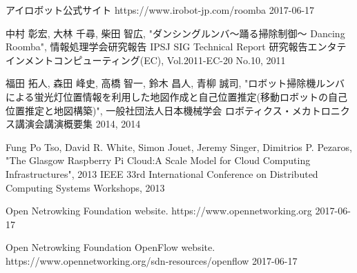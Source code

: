 \documentclass[a4paper, twocolumn]{jarticle}
\begin{document}
\begin{thebibliography}{9}
	{\small
    アイロボット公式サイト https://www.irobot-jp.com/roomba 2017-06-17

    中村 彰宏, 大林 千尋, 柴田 智広, "ダンシングルンバ～踊る掃除制御～
Dancing Roomba", 情報処理学会研究報告 IPSJ SIG Technical Report 研究報告エンタテインメントコンピューティング(EC), Vol.2011-EC-20 No.10, 2011

    福田 拓人, 森田 峰史, 高橋 智一, 鈴木 昌人, 青柳 誠司, "ロボット掃除機ルンバによる蛍光灯位置情報を利用した地図作成と自己位置推定(移動ロボットの自己位置推定と地図構築)", 一般社団法人日本機械学会 ロボティクス・メカトロニクス講演会講演概要集 2014, 2014

    Fung Po Tso, David R. White, Simon Jouet, Jeremy Singer, Dimitrios P. Pezaros, "The Glasgow Raspberry Pi Cloud:A Scale Model for Cloud Computing Infrastructures",  2013 IEEE 33rd International Conference on Distributed Computing Systems Workshops, 2013

    Open Netrowking Foundation website. https://www.opennetworking.org 2017-06-17

      Open Netrowking Foundation OpenFlow website. https://www.opennetworking.org/sdn-resources/openflow 2017-06-17


}
\end{thebibliography}
\end{document}
